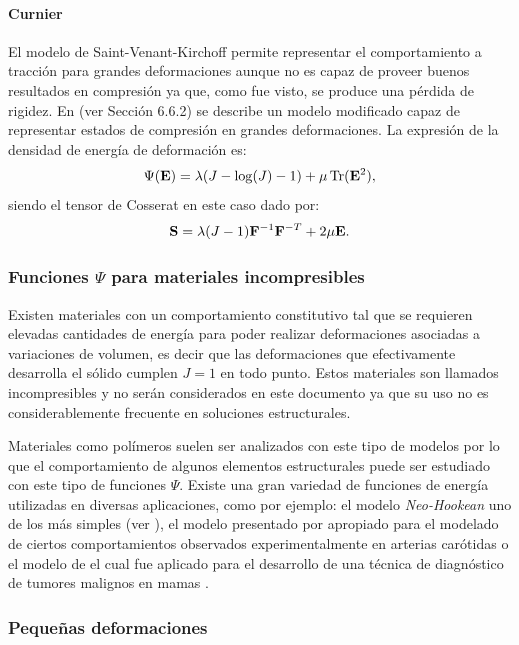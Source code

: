 \paragraph{Curnier}
%
El modelo de Saint-Venant-Kirchoff permite representar el comportamiento a tracción para grandes deformaciones aunque no es capaz de proveer buenos resultados en compresión ya que, como fue visto, se produce una pérdida de rigidez. %
%
En \citep{Curnier1994} (ver Sección 6.6.2) se describe un modelo modificado capaz de representar estados de compresión en grandes deformaciones. %
%
La expresión de la densidad de energía de deformación es:
%
\begin{equation}
\Psi ({\bf E}) = \lambda (J - \log(J)-1 ) + \mu \operatorname{\text{Tr}}({\bf E}^2),
\end{equation}
%
siendo el tensor de Cosserat en este caso dado por:
%
\begin{equation}
  {\bf S} = \lambda ( J-1 ) {\bf F}^{-1} {\bf F}^{-T}  + 2 \mu {\bf E}.
\end{equation}
%


\subsubsection{Funciones $\Psi$ para materiales incompresibles}
%
Existen materiales con un comportamiento constitutivo tal que se requieren elevadas cantidades de energía para poder realizar deformaciones asociadas a variaciones de volumen, es decir que las deformaciones que efectivamente desarrolla el sólido cumplen $J=1$ en todo punto. %
%
Estos materiales son llamados incompresibles y no serán considerados en este documento ya que su uso no es considerablemente frecuente en soluciones estructurales. %

Materiales como polímeros suelen ser analizados con este tipo de modelos por lo que el comportamiento de algunos elementos estructurales puede ser estudiado con este tipo de funciones $\Psi$. %
%
Existe una gran variedad de funciones de energía utilizadas en diversas aplicaciones, como por ejemplo: el modelo \textit{Neo-Hookean} uno de los más simples (ver \citep{Holzapfel2000a}), el modelo presentado por \cite{Delfino1997} apropiado para el modelado de ciertos comportamientos observados experimentalmente en arterias carótidas o el modelo de \cite{Veronda1970} el cual fue aplicado para el desarrollo de una técnica de diagnóstico de tumores malignos en mamas \citep{Goenezen2012}.


\subsubsection{Pequeñas deformaciones}

